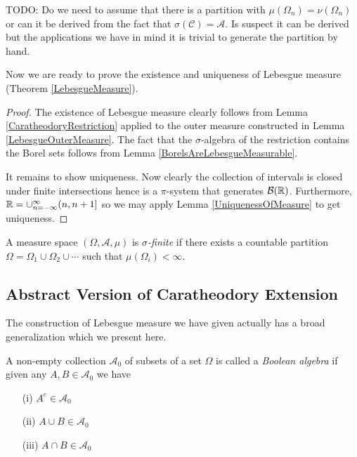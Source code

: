TODO: Do we need to assume that there is a partition with
$\mu(\Omega_n) = \nu(\Omega_n)$ or can it be derived from the fact
that $\sigma(\mathcal{C}) = \mathcal{A}$.  Is suspect it can be
derived but the applications we have in mind it is trivial to generate
the partition by hand.

 Now we are ready to prove the existence and uniqueness of Lebesgue
measure (Theorem \ref{LebesgueMeasure}).

\begin{proof}The existence of Lebesgue measure clearly follows from
  Lemma \ref{CaratheodoryRestriction} applied to the outer measure
  constructed in Lemma \ref{LebesgueOuterMeasure}.  The fact that the
  $\sigma$-algebra of the restriction contains the Borel sets follows
  from Lemma \ref{BorelsAreLebesgueMeasurable}.

It remains to show uniqueness.  Now clearly the collection of intervals is closed under finite
intersections hence is a $\pi$-system that generates
$\mathcal{B}(\mathbb{R})$.  Furthermore, $\mathbb{R} =
\cup_{n=-\infty}^\infty (n, n+1]$ so we may apply Lemma
\ref{UniquenessOfMeasure} to get uniqueness.
\end{proof}

\begin{defn}A measure space $(\Omega, \mathcal{A}, \mu)$ is
  \emph{$\sigma$-finite} if there exists a countable partition $\Omega
  = \Omega_1 \cup \Omega_2 \cup \cdots$ such that $\mu(\Omega_i) < \infty$.
\end{defn}

\subsection{Abstract Version of Caratheodory Extension}
The construction of Lebesgue measure we have given actually has a
broad generalization which we present here.

\begin{defn}A non-empty collection $\mathcal{A}_0$ of subsets of a set
  $\Omega$ is called a \emph{Boolean  algebra} if given any $A, B
  \in \mathcal{A}_0$ we have
\begin{itemize}
\item[(i)]$A^c \in \mathcal{A}_0$
\item[(ii)]$A \cup B \in \mathcal{A}_0$
\item[(iii)]$A \cap B \in \mathcal{A}_0$
\end{itemize}
\end{defn}

